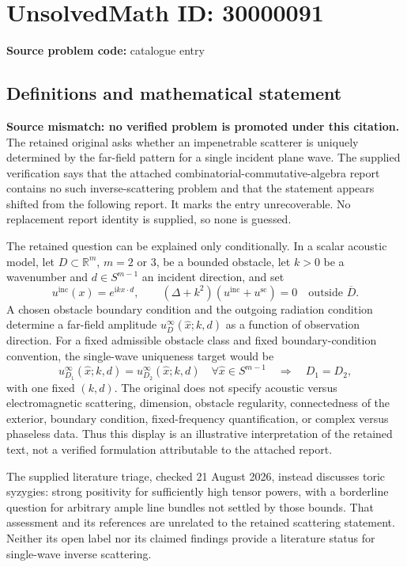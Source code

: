 \documentclass[11pt]{article}
\newcommand{\R}{\mathbb{R}}
\begin{document}
\section*{UnsolvedMath ID: 30000091}
\textbf{Source problem code:} catalogue entry
\subsection{Definitions and mathematical statement}
\textbf{Source mismatch: no verified problem is promoted under this citation.} The retained original asks whether an impenetrable scatterer is uniquely determined by the far-field pattern for a single incident plane wave. The supplied verification says that the attached combinatorial-commutative-algebra report contains no such inverse-scattering problem and that the statement appears shifted from the following report. It marks the entry unrecoverable. No replacement report identity is supplied, so none is guessed.

The retained question can be explained only conditionally. In a scalar acoustic model, let $D\subset\R^m$, $m=2$ or $3$, be a bounded obstacle, let $k>0$ be a wavenumber and $d\in S^{m-1}$ an incident direction, and set
\[
 u^{\mathrm{inc}}(x)=e^{\mathrm i kx\cdot d},\qquad
 (\Delta+k^2)(u^{\mathrm{inc}}+u^{\mathrm{sc}})=0
 \quad\text{outside }\overline D.
\]
A chosen obstacle boundary condition and the outgoing radiation condition determine a far-field amplitude $u_D^\infty(\widehat x;k,d)$ as a function of observation direction. For a fixed admissible obstacle class and fixed boundary-condition convention, the single-wave uniqueness target would be
\[
 u_{D_1}^\infty(\widehat x;k,d)=u_{D_2}^\infty(\widehat x;k,d)
 \quad\forall\widehat x\in S^{m-1}
 \quad\Longrightarrow\quad D_1=D_2,
\]
with one fixed $(k,d)$. The original does not specify acoustic versus electromagnetic scattering, dimension, obstacle regularity, connectedness of the exterior, boundary condition, fixed-frequency quantification, or complex versus phaseless data. Thus this display is an illustrative interpretation of the retained text, not a verified formulation attributable to the attached report.

The supplied literature triage, checked 21 August 2026, instead discusses toric syzygies: strong positivity for sufficiently high tensor powers, with a borderline question for arbitrary ample line bundles not settled by those bounds. That assessment and its references are unrelated to the retained scattering statement. Neither its open label nor its claimed findings provide a literature status for single-wave inverse scattering.
\end{document}
